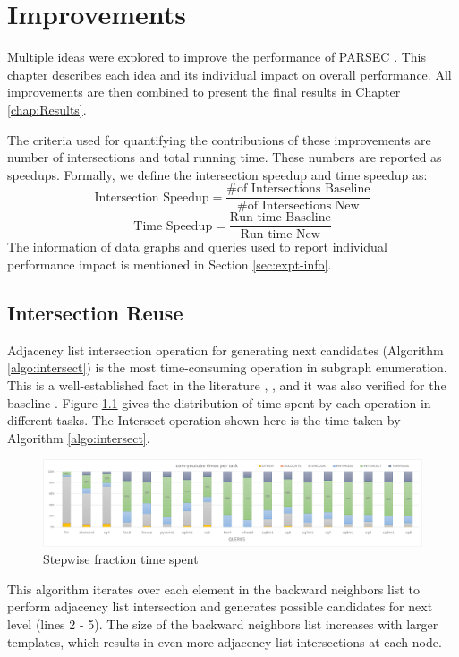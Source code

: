 \chapter{Improvements}
\label{chap:Improvements}
Multiple ideas were explored to improve the performance of PARSEC \cite{PARSEC_VD}.
This chapter describes each idea and its individual impact on overall performance.
All improvements are then combined to present the final results in Chapter \ref{chap:Results}.

The criteria used for quantifying the contributions of these improvements are number of intersections and total running time. These numbers are reported as speedups. Formally, we define the intersection speedup and time speedup as:
$$
    \text{Intersection Speedup} = \frac{\text{\# of Intersections Baseline}}{\text{\# of Intersections New}}
$$
$$
    \text{Time Speedup} = \frac{\text{Run time Baseline}}{\text{Run time New}}
$$
The information of data graphs and queries used to report individual performance impact is mentioned in Section \ref{sec:expt-info}.

\section{Intersection Reuse}\label{sec:reuse-impl}
Adjacency list intersection operation for generating next candidates (Algorithm \ref{algo:intersect}) is the most time-consuming operation in subgraph enumeration.
This is a well-established fact in the literature \cite{RPS-paper}, \cite{LIGHT}, \cite{VF3} and it was also verified for the baseline \cite{PARSEC_VD}.
Figure \ref{fig:time-dist} gives the distribution of time spent by each operation in different tasks.
The Intersect operation shown here is the time taken by Algorithm \ref{algo:intersect}.
\begin{figure}
    \includegraphics[width=\textwidth]{fig/improvements/time-distributions-yt.png}
    \caption{Stepwise fraction time spent}
    \label{fig:time-dist}
\end{figure}
This algorithm iterates over each element in the backward neighbors list to perform adjacency list intersection and generates possible candidates for next level (lines 2 - 5).
The size of the backward neighbors list increases with larger templates, which results in even more adjacency list intersections at each node.


